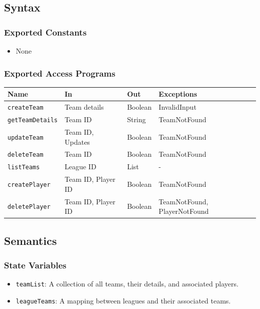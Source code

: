 \documentclass[12pt, titlepage]{article}
\begin{document}
\subsection{Syntax}

\subsubsection{Exported Constants}
\begin{itemize}
  \item None
\end{itemize}

\subsubsection{Exported Access Programs}
\begin{center}
  \begin{tabular}{|p{3cm}|p{4cm}|p{4cm}|p{4cm}|}
    \hline
    \textbf{Name}           & \textbf{In}        & \textbf{Out} & \textbf{Exceptions}          \\
    \hline
    \texttt{createTeam}     & Team details       & Boolean      & InvalidInput                 \\
    \texttt{getTeamDetails} & Team ID            & String       & TeamNotFound                 \\
    \texttt{updateTeam}     & Team ID, Updates   & Boolean      & TeamNotFound                 \\
    \texttt{deleteTeam}     & Team ID            & Boolean      & TeamNotFound                 \\
    \texttt{listTeams}      & League ID          & List         & -                            \\
    \texttt{createPlayer}   & Team ID, Player ID & Boolean      & TeamNotFound                 \\
    \texttt{deletePlayer}   & Team ID, Player ID & Boolean      & TeamNotFound, PlayerNotFound \\
    \hline
  \end{tabular}
\end{center}

\subsection{Semantics}

\subsubsection{State Variables}
\begin{itemize}
  \item \texttt{teamList}: A collection of all teams, their details, and associated players.
  \item \texttt{leagueTeams}: A mapping between leagues and their associated teams.
\end{itemize}
\end{document}
